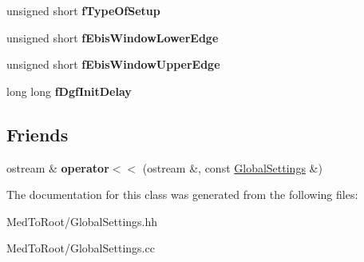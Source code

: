 \begin{DoxyCompactItemize}
\item 
\mbox{\label{class_global_settings_a7cfa68e7cba82725e43b12bcf85795fa}} 
unsigned short {\bfseries f\+Type\+Of\+Setup}
\item 
\mbox{\label{class_global_settings_a7ec5e9d460b0b4571c04ad7c6ae783ee}} 
unsigned short {\bfseries f\+Ebis\+Window\+Lower\+Edge}
\item 
\mbox{\label{class_global_settings_a72672076f3067f6866a4843f51e5311f}} 
unsigned short {\bfseries f\+Ebis\+Window\+Upper\+Edge}
\item 
\mbox{\label{class_global_settings_abc519c30d68b6a40a89850064cda3c64}} 
long long {\bfseries f\+Dgf\+Init\+Delay}
\end{DoxyCompactItemize}
\subsection*{Friends}
\begin{DoxyCompactItemize}
\item 
\mbox{\label{class_global_settings_ac6ab153308b559e7d080396b0fc7183b}} 
ostream \& {\bfseries operator$<$$<$} (ostream \&, const \hyperlink{class_global_settings}{Global\+Settings} \&)
\end{DoxyCompactItemize}


The documentation for this class was generated from the following files\+:\begin{DoxyCompactItemize}
\item 
Med\+To\+Root/Global\+Settings.\+hh\item 
Med\+To\+Root/Global\+Settings.\+cc\end{DoxyCompactItemize}
